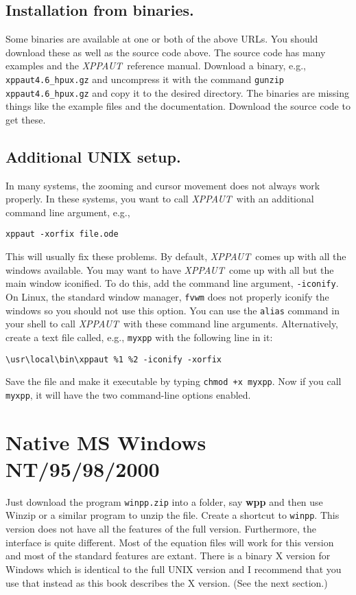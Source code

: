 \documentclass{article}
\newcommand{\XPP}{{\sl XPPAUT\, }}
\begin{document}
\subsection{Installation from binaries.}
Some binaries are available at one or both of the above URLs. You
should download these as well as the source code above. The source
code has many examples and the \XPP reference manual. Download a
binary, e.g., {\tt xppaut4.6\_hpux.gz} and uncompress it with the
command {\tt gunzip xppaut4.6\_hpux.gz} and copy it to the desired
directory. The binaries are missing things like the example files and
the documentation. Download the source code to get these.
 
\subsection{Additional UNIX setup.} In many systems, the zooming
and cursor movement does not always work properly.  
In these systems,
you want to call \XPP with an additional command line argument, e.g., 
\begin{verbatim}
xppaut -xorfix file.ode 
\end{verbatim}
This will usually fix these problems.
By default, \XPP comes up with all the windows available. You may
want to have \XPP come up with all but the main window iconified. 
 To do this, add the command line
argument, {\tt -iconify}. On Linux, the
standard window manager, {\tt fvwm} does not properly iconify the
windows so you should not use this option.   
You can use the {\tt alias} command in your shell to call \XPP with
these command line arguments. Alternatively, create a text file
called, e.g., {\tt myxpp} with the following line in it:
\begin{verbatim}
\usr\local\bin\xppaut %1 %2 -iconify -xorfix
\end{verbatim}
 Save the file and make it executable by typing {\tt chmod +x
myxpp}. Now if you call {\tt myxpp}, it will have the two command-line
options enabled.


\section{Native MS Windows NT/95/98/2000} 
Just download the program {\tt winpp.zip} into a folder, say {\bf wpp}
and then use Winzip or a similar program to unzip the file. Create a
shortcut to {\tt winpp}.  This version does not have all the features
of the full version. Furthermore, the interface is quite
different. Most of the equation files will work for this version and
most of the standard features are extant. 
 There is a binary X version for Windows which is identical to the
full UNIX version and I recommend that you use that instead as this
book describes the X version.
(See the next section.) 
\end{document}
